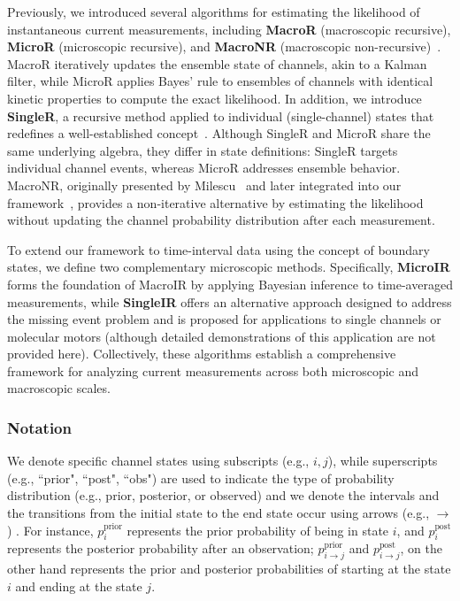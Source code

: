 \documentclass[9pt]{elife}
\begin{document}
	Previously, we introduced several algorithms for estimating the likelihood of instantaneous current measurements, including \textbf{MacroR} (macroscopic recursive), \textbf{MicroR} (microscopic recursive), and \textbf{MacroNR} (macroscopic non-recursive)~\cite{Moffatt}. MacroR iteratively updates the ensemble state of channels, akin to a Kalman filter, while MicroR applies Bayes’ rule to ensembles of channels with identical kinetic properties to compute the exact likelihood. In addition, we introduce \textbf{SingleR}, a recursive method applied to individual (single-channel) states that redefines a well-established concept~\cite{Qin}. Although SingleR and MicroR share the same underlying algebra, they differ in state definitions: SingleR targets individual channel events, whereas MicroR addresses ensemble behavior. MacroNR, originally presented by Milescu~\cite{Milescu} and later integrated into our framework~\cite{Moffatt}, provides a non-iterative alternative by estimating the likelihood without updating the channel probability distribution after each measurement.
	
	To extend our framework to time-interval data using the concept of boundary states, we define two complementary microscopic methods. Specifically, \textbf{MicroIR} forms the foundation of MacroIR by applying Bayesian inference to time-averaged measurements, while \textbf{SingleIR} offers an alternative approach designed to address the missing event problem and is proposed for applications to single channels or molecular motors (although detailed demonstrations of this application are not provided here). Collectively, these algorithms establish a comprehensive framework for analyzing current measurements across both microscopic and macroscopic scales.
	\subsubsection{Notation}
	We denote specific channel states using subscripts (e.g., \( i, j \)), while superscripts (e.g., ``prior", ``post", ``obs") are used to indicate the type of probability distribution (e.g., prior, posterior, or observed) and we denote the intervals and the transitions from the initial state to the end state occur using arrows (e.g., $\rightarrow$) . For instance, \( p_i^{\text{prior}} \) represents the prior probability of being in state \( i \), and \( p_i^{\text{post}} \) represents the posterior probability after an observation; $p_{i \rightarrow j}^{\text{prior}}$ and $p_{i \rightarrow j}^{\text{post}}$, on the other hand represents the prior  and posterior probabilities of starting at the state $i$ and ending at the state $j$. 
	
\end{document}
